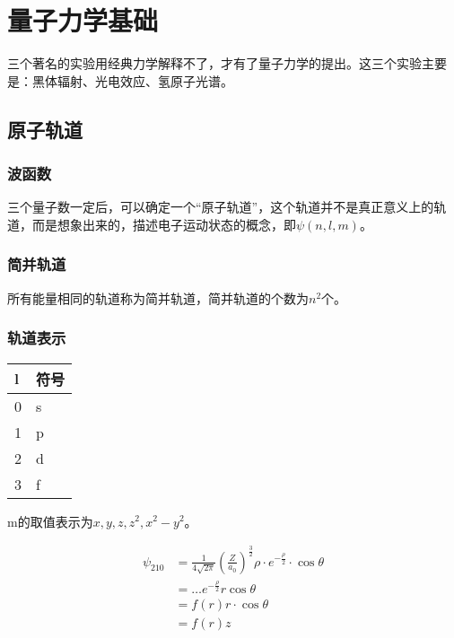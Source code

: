 \chapter{量子力学基础}

三个著名的实验用经典力学解释不了，才有了量子力学的提出。这三个实验主要是：黑体辐射、光电效应、氢原子光谱。







\section{原子轨道}

\subsection{波函数}

三个量子数一定后，可以确定一个“原子轨道”，这个轨道并不是真正意义上的轨道，而是想象出来的，描述电子运动状态的概念，即$\psi(n, l, m)$。


\subsection{简并轨道}


所有能量相同的轨道称为简并轨道，简并轨道的个数为$n^2$个。


\subsection{轨道表示}

\begin{table}[H]
    \centering
    \begin{tabular}{ll}
        \toprule
        l & 符号 \\ 
        \midrule
        0 & s \\
        1 & p \\ 
        2 & d \\
        3 & f \\
        \bottomrule
    \end{tabular}

\end{table}
m的取值表示为$x, y, z, z^2, x^2 - y^2$。

\begin{align*}
    \psi_{210} &= \frac{1}{4 \sqrt{2 \pi}} \left( \frac{Z}{a_0} \right)^{\frac{3}{2}} \rho \cdot e^{-\frac{\rho}{2}} \cdot \cos \theta \\ 
    &= \dots e^{-\frac{\rho}{2}} r \cos \theta \\
    &= f(r) r \cdot \cos \theta \\
    &= f(r) z
\end{align*}